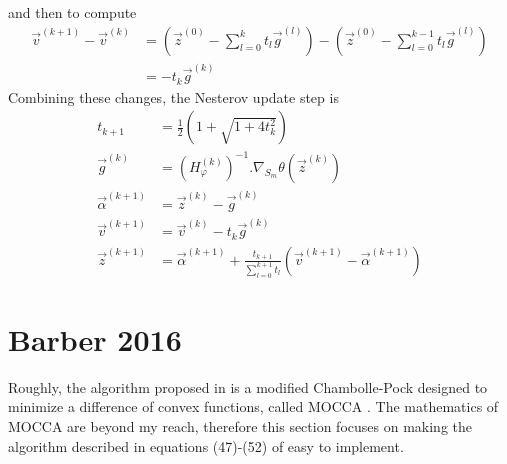 \documentclass[a4paper, 10pt]{article}
\begin{document}
and then to compute
\begin{equation*}
 \begin{split}
  \vec{v}^{(k+1)} - \vec{v}^{(k)} &= \left( \vec{z}^{(0)} - \sum_{l=0}^{k} t_l \vec{g}^{(l)} \right) - \left( \vec{z}^{(0)} - \sum_{l=0}^{k-1} t_l \vec{g}^{(l)} \right) \\
				  &= - t_k \vec{g}^{(k)}
 \end{split}
\end{equation*}
Combining these changes, the Nesterov update step is
\begin{equation*}
 \begin{split}
  t_{k+1} &= \frac{1}{2} \left( 1 + \sqrt{1 + 4 t_k^2} \right) \\
  \vec{g}^{(k)} &= \left( H_{\varphi}^{(k)} \right)^{-1}.\nabla_{S_m} \theta \left( \vec{z}^{(k)} \right) \\
  \vec{\alpha}^{(k+1)} &= \vec{z}^{(k)} - \vec{g}^{(k)} \\
  \vec{v}^{(k+1)} &= \vec{v}^{(k)} - t_k \vec{g}^{(k)} \\
  \vec{z}^{(k+1)} &= \vec{\alpha}^{(k+1)} + \frac{t_{k+1}}{\sum_{l=0}^{k+1} t_l} \left( \vec{v}^{(k+1)} - \vec{\alpha}^{(k+1)} \right)
 \end{split}
\end{equation*}


\section{Barber 2016}
Roughly, the algorithm proposed in \cite{barber_algorithm_2016} is a modified Chambolle-Pock designed to minimize a 
difference of convex functions, called MOCCA \cite{barber_mocca:_2015}. The mathematics of MOCCA are beyond my reach, 
therefore this section focuses on making the algorithm described in equations (47)-(52) of \cite{barber_algorithm_2016} easy to implement.
\end{document}

